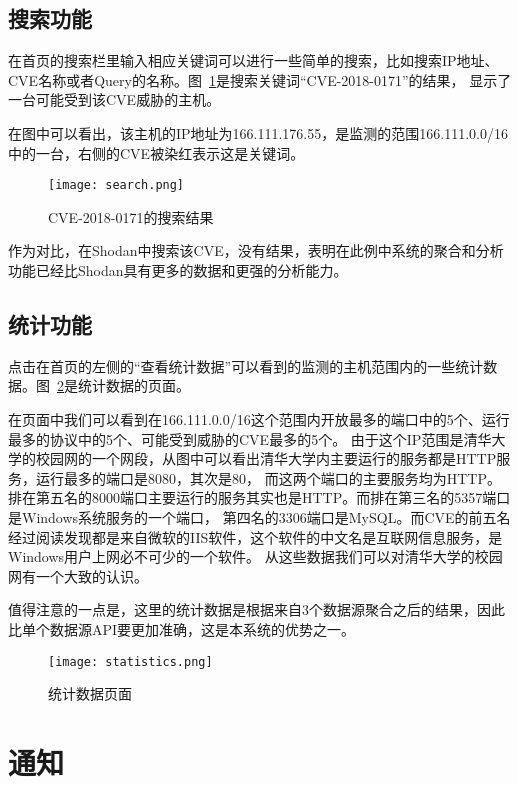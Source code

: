 \subsection{搜索功能}
\label{sec:search}

在首页的搜索栏里输入相应关键词可以进行一些简单的搜索，比如搜索IP地址、CVE名称或者Query的名称。图~\ref{fig:search}是搜索关键词“CVE-2018-0171”的结果，
显示了一台可能受到该CVE威胁的主机。

在图中可以看出，该主机的IP地址为166.111.176.55，是监测的范围166.111.0.0/16中的一台，右侧的CVE被染红表示这是关键词。

\begin{figure}[H]
    \centering
    \texttt{[image: search.png]}
    \caption{CVE-2018-0171的搜索结果}
    \label{fig:search}
\end{figure}

作为对比，在Shodan中搜索该CVE，没有结果，表明在此例中系统的聚合和分析功能已经比Shodan具有更多的数据和更强的分析能力。

\subsection{统计功能}
\label{sec:statistics}

点击在首页的左侧的“查看统计数据”可以看到的监测的主机范围内的一些统计数据。图~\ref{fig:statistics}是统计数据的页面。

在页面中我们可以看到在166.111.0.0/16这个范围内开放最多的端口中的5个、运行最多的协议中的5个、可能受到威胁的CVE最多的5个。
由于这个IP范围是清华大学的校园网的一个网段，从图中可以看出清华大学内主要运行的服务都是HTTP服务，运行最多的端口是8080，其次是80，
而这两个端口的主要服务均为HTTP。排在第五名的8000端口主要运行的服务其实也是HTTP。而排在第三名的5357端口是Windows系统服务的一个端口，
第四名的3306端口是MySQL。而CVE的前五名经过阅读发现都是来自微软的IIS软件，这个软件的中文名是互联网信息服务，是Windows用户上网必不可少的一个软件。
从这些数据我们可以对清华大学的校园网有一个大致的认识。

值得注意的一点是，这里的统计数据是根据来自3个数据源聚合之后的结果，因此比单个数据源API要更加准确，这是本系统的优势之一。

\begin{figure}[H]
    \centering
    \texttt{[image: statistics.png]}
    \caption{统计数据页面}
    \label{fig:statistics}
\end{figure}

\section{通知}
\label{sec:notification}

